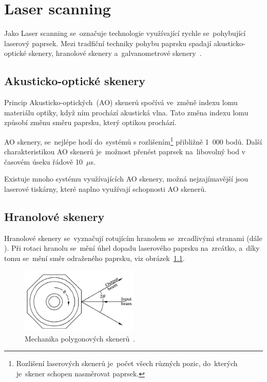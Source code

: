 \chapter{Laser scanning~\cite{scanning-handbook}}

Jako Laser scanning se~označuje technologie využívající rychle se~pohybující laserový paprsek. Mezi tradfiční techniky pohybu paprsku spadají akusticko-optické skenery, hranolové skenery a~galvanometrové skenery~\cite{mems-review}.

\section{Akusticko-optické skenery}
Princip Akusticko-optických~(AO) skenerů spočívá ve~změně indexu lomu materiálu optiky, když ním prochází akustická vlna. Tato změna indexu lomu způsobí změnu směru paprsku, který optikou prochází.

AO skenery, se~nejlépe hodí do~systémů s rozlišením\footnote{Rozlišení laserových skenerů je~počet všech různých pozic, do~kterých je~skener schopen nasměrovat paprsek.} přibližně 1~000 bodů.
Další charakteristikou AO skenerů je~možnost přenést paprsek na~libovolný bod v časovém úseku řádově 10~$\mu$s.

Existuje mnoho systému využívajících AO skenery, možná nejzajímavější jsou laserové tiskárny, které naplno využívají schopnosti AO skenerů.



\section{Hranolové skenery}
Hranolové skenery se~vyznačují rotujícím hranolem se~zrcadlivými stranami (dále ).
Při rotaci hranolu se~mění úhel dopadu laserového paprsku na~zrcátko, a~díky tomu se~mění směr odraženého paprsku, viz obrázek~\ref{fig:polygon-scanner}.

\begin{figure}[H]
  \centering
  \includegraphics[width=0.5\textwidth]{img/polygon-scanner.jpg}
  \caption{\label{fig:polygon-scanner} Mechanika polygonových skenerů~\cite{scanning-handbook}.}
\end{figure}

